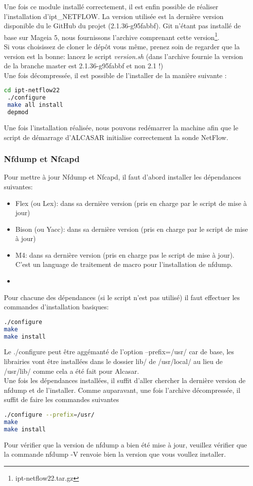Une fois ce module installé correctement, il est enfin possible de réaliser l'installation d'ipt\_NETFLOW. La version utilisée est la dernière version disponible du le GitHub du projet (2.1.36-g95fabbf). Git n'étant pas installé de base sur Mageia 5, nous fournissons l'archive comprenant cette version\footnote{ipt-netflow22.tar.gz}.\\
Si vous choisissez de cloner le dépôt vous même, prenez soin de regarder que la version est la bonne: lancez le script \textit{version.sh} (dans l'archive fournie la version de la branche master est 2.1.36-g95fabbf et non 2.1 !)\\
Une fois décompressée, il est possible de l'installer de la manière suivante :
\begin{lstlisting}[language=bash,style=custombash]
 cd ipt-netflow22
 ./configure
 make all install
 depmod
\end{lstlisting}
Une fois l'installation réalisée, nous pouvons redémarrer la machine afin que le script de démarrage d'ALCASAR initialise correctement la sonde NetFlow.

\subsubsection{Nfdump et Nfcapd}
Pour mettre à jour Nfdump et Nfcapd, il faut d'abord installer les dépendances suivantes:
\begin{itemize}
\item Flex (ou Lex): dans sa dernière version (pris en charge par le script de mise à jour)
\item Bison (ou Yacc): dans sa dernière version (pris en charge par le script de mise à jour)
\item M4: dans sa dernière version (pris en charge pas le script de mise à jour). C'est un language de traitement de macro pour l'installation de nfdump.
\item 
\end{itemize}
Pour chacune des dépendances (si le script n'est pas utilisé) il faut effectuer les commandes d'installation basiques:
\begin{lstlisting}[language=bash,style=custombash]
./configure 
make
make install
\end{lstlisting}
Le ./configure peut être aggémanté de l'option --prefix=/usr/ car de base, les librairies vont être installées dans le dossier lib/ de /usr/local/ au lieu de /usr/lib/ comme cela a été fait pour Alcasar.\\
Une fois les dépendances installées, il suffit d'aller chercher la dernière version de nfdump et de l'installer. Comme auparavant, une fois l'archive décompressée, il suffit de faire les commandes suivantes
\begin{lstlisting}[language=bash,style=custombash]
./configure --prefix=/usr/
make
make install
\end{lstlisting}
Pour vérifier que la version de nfdump a bien été mise à jour, veuillez vérifier que la commande nfdump -V renvoie bien la version que vous voullez installer.


